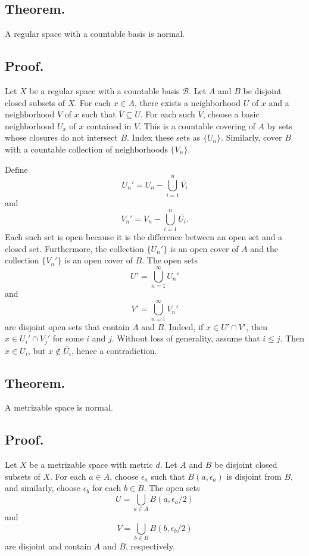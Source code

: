 \documentclass[titlepage]{article}
\begin{document}
\subsection{Theorem.} A regular space with a countable basis is normal.

\subsection{Proof.} Let $X$ be a regular space with a countable basis $\mathcal{B}$. Let $A$ and $B$ be disjoint closed subsets of $X$. For each $x \in A$, there exists a neighborhood $U$ of $x$ and a neighborhood $V$ of $x$ such that $\overline{V} \subseteq U$. For each such $V$, choose a basic neighborhood $U_{x}$ of $x$ contained in $V$. This is a countable covering of $A$ by sets whose closures do not intersect $B$. Index these sets as $\{U_{n}\}$. Similarly, cover $B$ with a countable collection of neighborhoods $\{V_{n}\}$.

Define 
$$U_{n}' = U_{n} - \bigcup_{i=1}^{n} \overline{V_{i}}$$
and 
$$V_{n}' = V_{n} - \bigcup_{i=1}^{n} \overline{U_{i}}.$$
Each such set is open because it is the difference between an open set and a closed set. Furthermore, the collection $\{U_{n}'\}$ is an open cover of $A$ and the collection $\{V_{n}'\}$ is an open cover of $B$. The open sets 
$$U' = \bigcup_{n=1}^{\infty} U_{n}'$$
and 
$$V' = \bigcup_{n=1}^{\infty} V_{n}'$$
are disjoint open sets that contain $A$ and $B$. Indeed, if $x \in U' \cap V'$, then $x \in U_{i}' \cap V_{j}'$ for some $i$ and $j$. Without loss of generality, assume that $i \leq j$. Then $x \in U_{i}$, but $x \not\in \overline{U_{i}}$, hence a contradiction.

\subsection{Theorem.} A metrizable space is normal.

\subsection{Proof.} Let $X$ be a metrizable space with metric $d$. Let $A$ and $B$ be disjoint closed subsets of $X$. For each $a \in A$, choose $\epsilon_{a}$ such that $B(a, \epsilon_{a})$ is disjoint from $B$, and similarly, choose $\epsilon_{b}$ for each $b \in B$. The open sets 
$$U = \bigcup_{a \in A} B(a, \epsilon_{a}/2)$$
and 
$$V = \bigcup_{b \in B} B(b, \epsilon_{b}/2)$$
are disjoint and contain $A$ and $B$, respectively.
\end{document}
